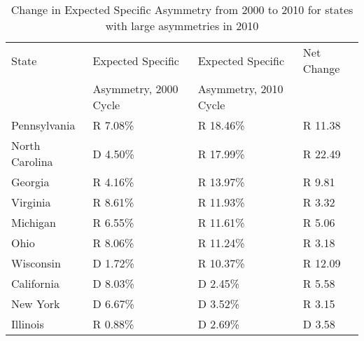 \begin{table}[htb!]
\centering
\caption{Change in Expected Specific Asymmetry from 2000 to 2010 for states with large asymmetries in 2010 \label{tab:Asym2000to2010}}
\begin{tabular}{|l|l|l|l|}
\hline
State & Expected Specific     & Expected Specific & Net Change\\
      & Asymmetry, 2000 Cycle & Asymmetry, 2010 Cycle & \\
\hline
\hline
Pennsylvania & R 7.08\% & R 18.46\% & R 11.38\\
\hline
North Carolina & D 4.50\% & R 17.99\% & R 22.49\\
\hline
Georgia & R 4.16\% & R 13.97\% & R 9.81\\
\hline
Virginia & R 8.61\% & R 11.93\% & R 3.32\\
\hline
Michigan & R 6.55\% & R 11.61\% & R 5.06\\
\hline
Ohio & R 8.06\% & R 11.24\% & R 3.18\\
\hline
Wisconsin & D 1.72\% & R 10.37\% & R 12.09\\
\hline
California & D 8.03\% & D 2.45\% & R 5.58\\
\hline
New York & D 6.67\% & D 3.52\% & R 3.15\\
\hline
Illinois & R 0.88\% & D 2.69\% & D 3.58\\
\hline
\end{tabular}
\end{table}
